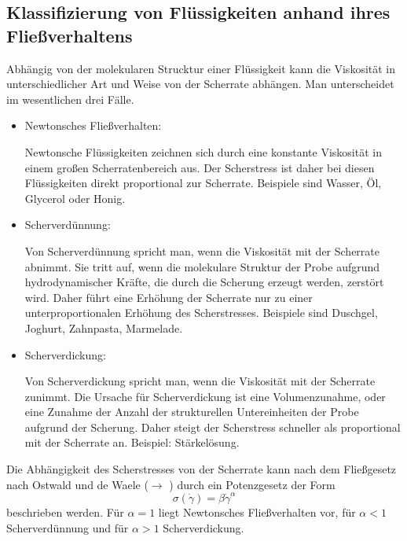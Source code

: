 \documentclass[11pt,a4paper,oneside]{scrartcl}
\begin{document}
\subsection{Klassifizierung von Flüssigkeiten anhand ihres Fließverhaltens}
Abhängig von der molekularen Strucktur einer Flüssigkeit kann die Viskosität in unterschiedlicher Art und Weise von der Scherrate abhängen. Man unterscheidet im wesentlichen drei Fälle.

\begin{itemize}
\item Newtonsches Fließverhalten: 

Newtonsche Flüssigkeiten zeichnen sich durch eine konstante Viskosität in einem großen Scherratenbereich aus. Der Scherstress ist daher bei diesen Flüssigkeiten direkt proportional zur Scherrate. Beispiele
sind Wasser, Öl, Glycerol oder Honig.

\item Scherverdünnung: 

Von Scherverdünnung spricht man, wenn die Viskosität mit der Scherrate abnimmt. Sie tritt auf, wenn die molekulare Struktur der Probe aufgrund hydrodynamischer Kräfte, die durch die Scherung erzeugt werden,
zerstört wird. Daher führt eine Erhöhung der Scherrate nur zu einer unterproportionalen Erhöhung des Scherstresses. Beispiele sind Duschgel, Joghurt, Zahnpasta, Marmelade.

\item Scherverdickung: 

Von Scherverdickung spricht man, wenn die Viskosität mit der Scherrate zunimmt. Die Ursache für Scherverdickung ist eine Volumenzunahme, oder eine Zunahme der Anzahl der strukturellen Untereinheiten der Probe
aufgrund der Scherung. Daher steigt der Scherstress schneller als proportional mit der Scherrate an. Beispiel: Stärkelösung.
\end{itemize}
Die Abhängigkeit des Scherstresses von der Scherrate kann nach dem Fließgesetz nach Ostwald und de Waele ($\rightarrow$ \cite{dewiki:192899581}) durch ein Potenzgesetz der Form 
\begin{equation}
\sigma(\dot\gamma)=\beta\dot\gamma^\alpha
\end{equation}
beschrieben werden. Für $\alpha=1$ liegt Newtonsches Fließverhalten vor, für $\alpha<1$ Scherverdünnung und für $\alpha>1$ Scherverdickung.
\end{document}
